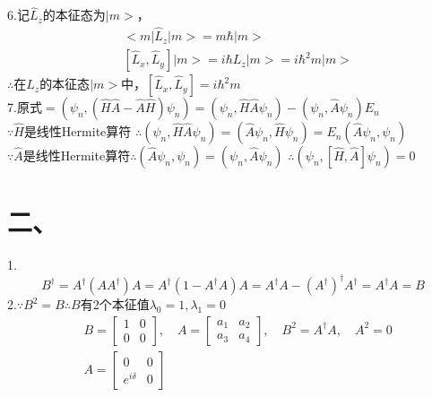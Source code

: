 \documentclass[UTF8]{ctexart}
\begin{document}
6.记$\hat L_z$的本征态为$\lvert m>$，
\begin{equation*}
  \begin{aligned}
     & <m\lvert\hat L_z\rvert m>=m\hbar\lvert m>                           \\
     & [\hat L_x,\hat L_y]\lvert m>=i\hbar L_z\lvert m>=i\hbar^2m\lvert m>
  \end{aligned}
\end{equation*}
$\therefore$在$\hat L_z$的本征态$\lvert m>$中，$[\hat L_x,\hat L_y]=i\hbar^2m$\\
7.原式$=(\psi_n,(\hat H\hat A-\hat A\hat H)\psi_n)
  =(\psi_n,\hat H\hat A\psi_n)-(\psi_n,\hat A\psi_n)E_n$\\
$\because\hat H$是线性Hermite算符
$\therefore(\psi_n,\hat H\hat A\psi_n)=(\hat A\psi_n,\hat H\psi_n)=E_n(\hat A\psi_n,\psi_n)$\\
$\because\hat A$是线性Hermite算符$\therefore(\hat A\psi_n,\psi_n)=(\psi_n,\hat A\psi_n)$
$\therefore(\psi_n,[\hat H,\hat A]\psi_n)=0$\\
\section*{二、}
1.
\begin{equation*}
  B^\dagger=A^\dagger(AA^\dagger)A=A^\dagger(1-A^\dagger A)A=A^\dagger A
  -(A^\dagger)^\dagger A^\dagger=A^\dagger A=B
\end{equation*}
2.$\because B^2=B\therefore B$有2个本征值$\lambda_0=1,\lambda_1=0$
\begin{equation*}
  \begin{aligned}
     & B=\begin{bmatrix}
      1 & 0 \\
      0 & 0
    \end{bmatrix},\quad
    A=\begin{bmatrix}
      a_1 & a_2 \\
      a_3 & a_4
    \end{bmatrix},\quad
    B^2=A^\dagger A,\quad A^2=0          \\
     & A=\begin{bmatrix}
      0           & 0 \\
      e^{i\delta} & 0
    \end{bmatrix}
  \end{aligned}
\end{equation*}
\end{document}
